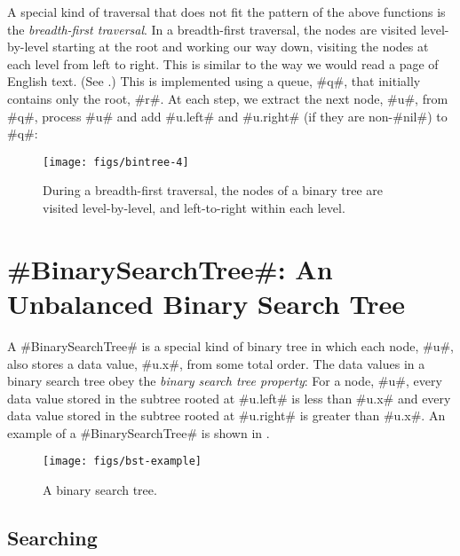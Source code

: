 A special kind of traversal that does not fit the pattern of the above
functions is the \emph{breadth-first traversal}.  In a breadth-first
traversal, the nodes are visited level-by-level starting at the root
and working our way down, visiting the nodes at each level from left
to right.  This is similar to the way we would read a page of English
text. (See .)  This is implemented using a queue, #q#,
that initially contains only the root, #r#.  At each step, we extract
the next node, #u#, from #q#, process #u# and add #u.left# and #u.right#
(if they are non-#nil#) to #q#:

\begin{figure}
  \begin{center}
    \texttt{[image: figs/bintree-4]}
  \end{center}
  \caption{During a breadth-first traversal, the nodes of a binary tree
  are visited
level-by-level, and left-to-right within each level.}
\end{figure}





\section{#BinarySearchTree#: An Unbalanced Binary Search Tree}

A #BinarySearchTree# is a special kind of binary tree in which each node, #u#,
also stores a data value, #u.x#, from some total order.  The data values in
a binary search tree obey the \emph{binary search tree property}:  For
a node, #u#, every data value stored in the subtree rooted at #u.left#
is less than #u.x# and every data value stored in the subtree rooted at
#u.right# is greater than #u.x#.  An example of a #BinarySearchTree# is shown in .

\begin{figure}
  \begin{center}
    \texttt{[image: figs/bst-example]}
  \end{center}
  \caption{A binary search tree.}
\end{figure}


\subsection{Searching}

